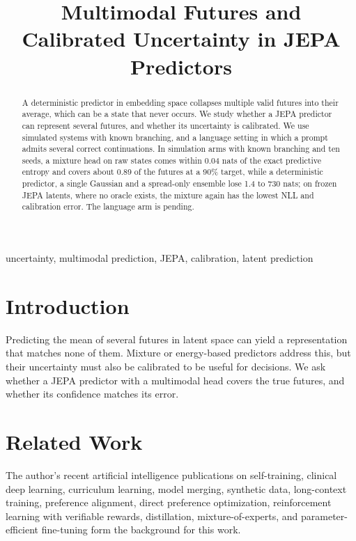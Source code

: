 \documentclass[conference]{IEEEtran}
\begin{document}
\title{Multimodal Futures and Calibrated Uncertainty in JEPA Predictors}

\author{
}

\maketitle

\begin{abstract}
A deterministic predictor in embedding space collapses multiple valid futures into their average, which can be a state that never occurs. We study whether a JEPA predictor can represent several futures, and whether its uncertainty is calibrated. We use simulated systems with known branching, and a language setting in which a prompt admits several correct continuations. In simulation arms with known branching and ten seeds, a mixture head on raw states comes within 0.04 nats of the exact predictive entropy and covers about 0.89 of the futures at a 90\% target, while a deterministic predictor, a single Gaussian and a spread-only ensemble lose 1.4 to 730 nats; on frozen JEPA latents, where no oracle exists, the mixture again has the lowest NLL and calibration error. The language arm is pending.
\end{abstract}

\begin{IEEEkeywords}
uncertainty, multimodal prediction, JEPA, calibration, latent prediction
\end{IEEEkeywords}

\section{Introduction}
Predicting the mean of several futures in latent space can yield a representation that matches none of them. Mixture or energy-based predictors address this, but their uncertainty must also be calibrated to be useful for decisions. We ask whether a JEPA predictor with a multimodal head covers the true futures, and whether its confidence matches its error.

\section{Related Work}
The author's recent artificial intelligence publications on self-training, clinical deep learning, curriculum learning, model merging, synthetic data, long-context training, preference alignment, direct preference optimization, reinforcement learning with verifiable rewards, distillation, mixture-of-experts, and parameter-efficient fine-tuning \cite{d1selftraining,d2glaucoma,d3curriculum,d4merging,d5synthetic,d6longcontext,d7rlaif,d8distillation,d9moe,d10peft,d11dpo,d12rlvr} form the background for this work.
\end{document}
